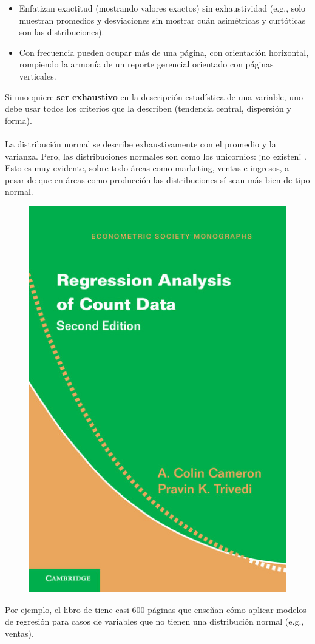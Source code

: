 \documentclass[aspectratio=169]{beamer}
\begin{document}
\begin{frame}
\Large
\begin{itemize}
    \item Enfatizan exactitud (mostrando valores exactos) sin exhaustividad (e.g., solo muestran promedios y desviaciones sin mostrar cuán asimétricas y curtóticas son las distribuciones). 
    \vspace{0.8cm}
    \pause
    \item Con frecuencia pueden ocupar más de una página, con orientación horizontal, rompiendo la armonía de un reporte gerencial orientado con páginas verticales.
\end{itemize}
\end{frame}

\begin{frame}
Si uno quiere \textbf{ser exhaustivo} en la descripción estadística de una variable, uno debe usar todos los criterios que la describen (tendencia central, dispersión y forma). \\
\vspace{0.9cm}
\pause
\\La distribución normal se describe exhaustivamente con el promedio y la varianza. Pero, las distribuciones normales son como los unicornios: ¡no existen! \cite{Micceri1989}. Esto es muy evidente, sobre todo áreas como marketing, ventas e ingresos, a pesar de que en áreas como producción las distribuciones sí sean más bien de tipo normal.
\end{frame}

\begin{frame}
\begin{figure}
\centering
 \includegraphics[width=.25\textwidth]{libro.png}
\end{figure}
Por ejemplo, el libro de \citeauthor{Cameron2013} \citeyear{Cameron2013} tiene casi 600 páginas que enseñan cómo aplicar modelos de regresión para casos de variables que no tienen una distribución normal (e.g., ventas).
\end{frame}
\end{document}
